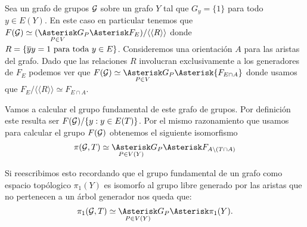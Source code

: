 \documentclass[tesis.tex]{subfiles}
\begin{document}
\begin{ej}
	Sea un grafo de grupos $\cal G$ sobre un grafo $Y$ tal que $G_y = \{ 1 \}$ para todo $y \in E(Y)$.
	En este caso en particular tenemos que 	$F(\cG) \simeq (\underset{P \in V}{\Asterisk} G_P \Asterisk F_{E}) / \langle \langle  R \rangle \rangle$
	donde $R = \{ \overline{y}y = 1 \ \text{para toda} \ y \in E \}$.
	Consideremos una orientación $A$ para las aristas del grafo.
	Dado que las relaciones $R$ involucran exclusivamente a los generadores de $F_{E}$ podemos ver que $F(\cG) \simeq \underset{P \in V}{\Asterisk} G_P \Asterisk {F_{E \cap A}}$ donde usamos que $F_{E}/\langle \langle  R \rangle \rangle \simeq F_{E \cap A}$.
	
	Vamos a calcular el grupo fundamental de este grafo de grupos.
	Por definición este resulta ser $F({\cal G}) / \{  y : y \in E(T) \}$.
	Por el mismo razonamiento que usamos para calcular el grupo $F({\cal G})$ obtenemos el siguiente isomorfismo
	\[
		\pi({\cal G}, T) \simeq \underset{P \in V(Y)}{\Asterisk} G_P \Asterisk F_{A \setminus (T \cap A)}
	\]
	
	Si reescribimos esto recordando que el grupo fundamental de un grafo como espacio topólogico $\pi_1(Y)$ es isomorfo al grupo libre generado por las aristas que no pertenecen a un árbol generador nos queda que: 
	\[
		\pi_1({\cal G}, T) \simeq \underset{P \in V(Y)}{\Asterisk} G_P  \Asterisk \pi_1(Y). 
	\]
\end{ej}
\end{document}
